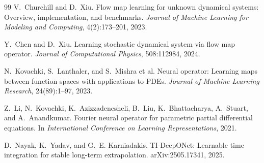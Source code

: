 \documentclass[11pt]{article}
\begin{document}
\begin{thebibliography}{99}
V.~Churchill and D.~Xiu.
\newblock Flow map learning for unknown dynamical systems: Overview, implementation, and benchmarks.
\newblock \emph{Journal of Machine Learning for Modeling and Computing}, 4(2):173--201, 2023.

Y.~Chen and D.~Xiu.
\newblock Learning stochastic dynamical system via flow map operator.
\newblock \emph{Journal of Computational Physics}, 508:112984, 2024.

N.~Kovachki, S.~Lanthaler, and S.~Mishra et al.
\newblock Neural operator: Learning maps between function spaces with applications to PDEs.
\newblock \emph{Journal of Machine Learning Research}, 24(89):1--97, 2023.

Z.~Li, N.~Kovachki, K.~Azizzadenesheli, B.~Liu, K.~Bhattacharya, A.~Stuart, and A.~Anandkumar.
\newblock Fourier neural operator for parametric partial differential equations.
\newblock In \emph{International Conference on Learning Representations}, 2021.

D.~Nayak, K.~Yadav, and G.~E. Karniadakis.
\newblock TI-DeepONet: Learnable time integration for stable long-term extrapolation.
\newblock arXiv:2505.17341, 2025.

\end{thebibliography}
\end{document}
